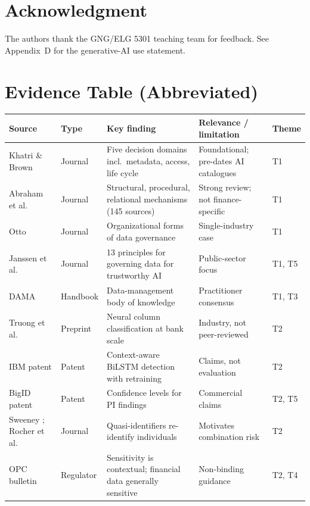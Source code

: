 \documentclass[journal,onecolumn,11pt]{IEEEtran}
\begin{document}
\section*{Acknowledgment}
The authors thank the GNG/ELG 5301 teaching team for feedback. See Appendix~D for the generative-AI use statement.




\appendices
\section{Evidence Table (Abbreviated)}
\label{app:evidence}
{\footnotesize
\begin{longtable}{L{2.3cm} L{1.7cm} L{4.4cm} L{4.6cm} L{0.8cm}}
\toprule
\textbf{Source} & \textbf{Type} & \textbf{Key finding} & \textbf{Relevance / limitation} & \textbf{Theme} \\
\midrule
\endhead
Khatri \& Brown \cite{khatri} & Journal & Five decision domains incl.\ metadata, access, life cycle & Foundational; pre-dates AI catalogues & T1 \\
Abraham et al.\ \cite{abraham} & Journal & Structural, procedural, relational mechanisms (145 sources) & Strong review; not finance-specific & T1 \\
Otto \cite{otto} & Journal & Organizational forms of data governance & Single-industry case & T1 \\
Janssen et al.\ \cite{janssen} & Journal & 13 principles for governing data for trustworthy AI & Public-sector focus & T1, T5 \\
DAMA \cite{dmbok} & Handbook & Data-management body of knowledge & Practitioner consensus & T1, T3 \\
Truong et al.\ \cite{truong} & Preprint & Neural column classification at bank scale & Industry, not peer-reviewed & T2 \\
IBM patent \cite{pat_ibm} & Patent & Context-aware BiLSTM detection with retraining & Claims, not evaluation & T2 \\
BigID patent \cite{pat_bigid} & Patent & Confidence levels for PI findings & Commercial claims & T2, T5 \\
Sweeney \cite{sweeney}; Rocher et al.\ \cite{rocher} & Journal & Quasi-identifiers re-identify individuals & Motivates combination risk & T2 \\
OPC bulletin \cite{opc_sensitive} & Regulator & Sensitivity is contextual; financial data generally sensitive & Non-binding guidance & T2, T4 \\

\end{longtable}}
\end{document}
